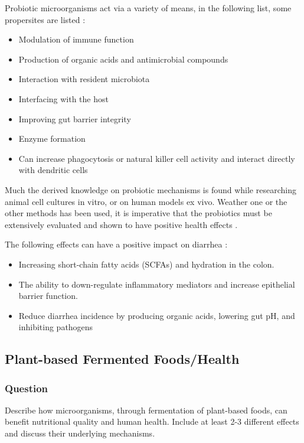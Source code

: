 Probiotic microorganisms act via a variety of means, in the following list, some propersites are listed \cite*{L10-Pro_Pre}:
\begin{itemize}
    \item Modulation of immune function
    \item Production of organic acids and antimicrobial compounds
    \item Interaction with resident microbiota
    \item Interfacing with the host
    \item Improving gut barrier integrity
    \item Enzyme formation
    \item Can increase phagocytosis or natural killer cell activity and interact directly with dendritic cells
\end{itemize}

Much the derived knowledge on probiotic mechanisms is found while researching animal cell cultures in vitro, or on human models ex vivo. Weather one or the other methods has been used, it is imperative that the probiotics must be extensively evaluated and shown to have positive health effects \cite*{L10-Pro_Pre,LS19}.

The following effects can have a positive impact on diarrhea \cite*{L10-Pro_Pre}:
\begin{itemize}
    \item Increasing short-chain fatty acids (SCFAs) and hydration in the colon.
    \item The ability to down-regulate inflammatory mediators and increase epithelial barrier function.
    \item Reduce diarrhea incidence by producing organic acids, lowering gut pH, and inhibiting pathogens
\end{itemize}

\subsection{Plant-based Fermented Foods/Health}
\subsubsection*{Question}
Describe how microorganisms, through fermentation of plant-based foods, can benefit nutritional quality and human health. Include at least 2-3 different effects and discuss their underlying mechanisms. 

